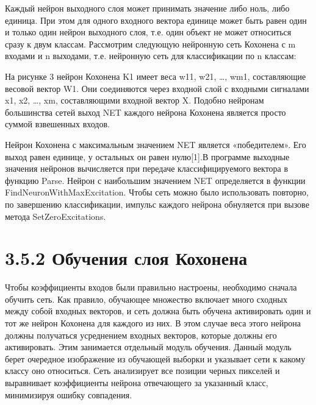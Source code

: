 \documentclass[14pt,a4paper]{extreport}
\begin{document}
  \hspace {4ex} Каждый нейрон выходного слоя может принимать значение либо ноль, либо единица. При этом для одного входного вектора единице может быть равен один и только один нейрон выходного слоя, т.е. один объект не может относиться сразу к двум классам. 
Рассмотрим следующую нейронную сеть Кохонена с m входами и n выходами, т.е. нейронную сеть для классификации по n классам:\

  
  \hspace {4ex} На рисунке 3 нейрон Кохонена K1 имеет веса w11, w21, …, wm1, составляющие весовой вектор W1. Они соединяются через входной слой с входными сигналами x1, x2, …, xm, составляющими входной вектор X. Подобно нейронам большинства сетей выход NET каждого нейрона Кохонена является просто суммой взвешенных входов.\
  
  \hspace {4ex} Нейрон Кохонена с максимальным значением NET является «победителем». Его выход равен единице, у остальных он равен нулю[1].В программе выходные значения  нейронов вычисляется при передаче классифицируемого вектора в функцию  Parse. Нейрон с наибольшим значением NET определяется в функции FindNeuronWithMaxExcitation. Чтобы сеть можно было использовать повторно, по завершению классификации, импульс каждого нейрона обнуляется при вызове метода SetZeroExcitations.


                  \section*{\normalsize\hspace{4ex}3.5.2 Обучения слоя Кохонена}
  \hspace {4ex} Чтобы коэффициенты входов были правильно настроены, необходимо сначала обучить сеть. Как правило, обучающее множество включает много сходных между собой входных векторов, и сеть должна быть обучена активировать один и тот же нейрон Кохонена для каждого из них. В этом случае веса этого нейрона должны получаться усреднением входных векторов, которые должны его активировать. Этим занимается отдельный модуль обучения. Данный модуль берет очередное изображение из обучающей выборки и указывает сети к какому классу оно относиться. Сеть анализирует все позиции черных пикселей и выравнивает коэффициенты нейрона отвечающего за указанный класс, минимизируя ошибку совпадения.\
  
\end{document}
